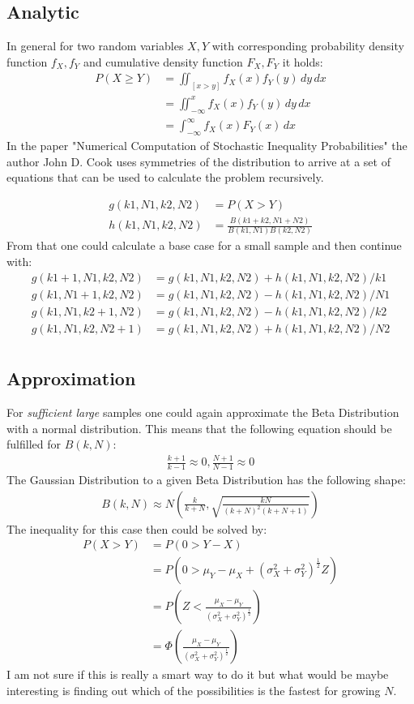 \documentclass[../Thesis.tex]{subfiles}
\begin{document}
\subsection{Analytic}
In general for two random variables $X,Y$ with corresponding probability density function $f_X,f_Y$ and cumulative density function $F_X,F_Y$ it holds: 
\begin{align*}
P(X \geq Y ) &= \iint_{[x>y]} f_X(x)f_Y(y) \,dy\,dx \\
					&= \iint_{-\infty}^{x} f_X(x)f_Y(y) \,dy\,dx \\
					&= \int_{-\infty}^{\infty}f_X(x)F_Y(x)\,dx
\end{align*}
In the paper "Numerical Computation of Stochastic Inequality Probabilities" the author John D. Cook uses symmetries of the distribution to arrive at a set of equations that can be used to calculate the problem recursively.

\begin{align*}
g(k1,N1,k2,N2) &= P(X>Y) \\
h(k1,N1,k2,N2) &= \frac{B(k1+k2,N1+N2)}{B(k1,N1)B(k2,N2)}
\end{align*}
From that one could calculate a base case for a small sample and then continue with:
\begin{align*}
g(k1 + 1,N1,k2,N2) &= g(k1,N1,k2,N2) + h(k1,N1,k2,N2)/k1 \\
g(k1,N1 + 1,k2,N2) &= g(k1,N1,k2,N2) - h(k1,N1,k2,N2)/N1 \\
g(k1,N1,k2 + 1,N2) &= g(k1,N1,k2,N2) - h(k1,N1,k2,N2)/k2 \\
g(k1,N1,k2,N2 + 1) &= g(k1,N1,k2,N2) + h(k1,N1,k2,N2)/N2 \\
\end{align*}


\subsection{Approximation}
For \textit{sufficient large} samples one could again approximate the Beta Distribution with a normal distribution. This means that the following equation should be fulfilled for $B(k,N)$:
\begin{align*}
\frac{k + 1}{k - 1}\approx 0,
\frac{N + 1}{N - 1}\approx 0
\end{align*}
The Gaussian Distribution to a given Beta Distribution has the following shape:
\begin{align*}
B(k,N)\approx N\left(\frac{k}{k+N},\sqrt{\frac{kN}{(k+N)^2(k+N+1)}} \right)
\end{align*}
The inequality for this case then could be solved by:
\begin{align*}
P(X>Y)	&= P(0 > Y - X) \\
			&= P(0 > \mu_Y - \mu_X + (\sigma_X^2 + \sigma_Y^2)^{\frac{1}{2}}Z) \\
			&= P\left(Z < \frac{\mu_X - \mu_Y}{(\sigma_X^2 + \sigma_Y^2)^{\frac{1}{2}}}\right) \\
			&= \Phi\left(\frac{\mu_X - \mu_Y}{(\sigma_X^2 + \sigma_Y^2)^{\frac{1}{2}}}\right)
\end{align*}
I am not sure if this is really a smart way to do it but what would be maybe interesting is finding out which of the possibilities is the fastest for growing $N$.
\end{document}
